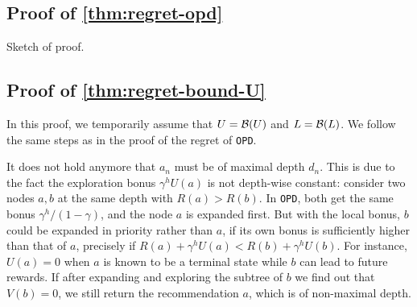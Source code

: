 \documentclass[runningheads]{llncs}
\begin{document}
\subsection{Proof of \autoref{thm:regret-opd}}
Sketch of proof.\\
\noindent{}

\subsection{Proof of \autoref{thm:regret-bound-U}}
In this proof, we temporarily assume that $U=\mathcal{B}(U)$ and $L=\mathcal{B}(L)$. We follow the same steps as in the proof of the regret of \texttt{OPD}.

\begin{remark}
It does not hold anymore that $a_n$ must be of maximal depth $d_n$.  This is due to the fact the exploration bonus $\gamma^h U(a)$ is not depth-wise constant: consider two nodes $a,b$ at the same depth with $R(a) > R(b)$. In \texttt{OPD}, both get the same bonus $\gamma^h/(1-\gamma)$, and the node $a$ is expanded first. But with the local bonus, $b$ could be expanded in priority rather than $a$, if its own bonus is sufficiently higher than that of $a$, precisely if $R(a)+\gamma^h U(a) < R(b)+\gamma^h U(b)$. For instance, $U(a)=0$ when $a$ is known to be a terminal state while $b$ can lead to future rewards. If after expanding and exploring the subtree of $b$ we find out that $V(b) = 0$, we still return the recommendation $a$, which is of non-maximal depth.
\end{remark}
\end{document}
